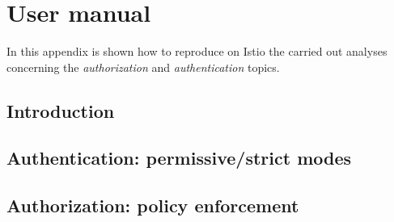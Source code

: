 \appendix
\chapter{User manual}
In this appendix is shown how to reproduce on Istio the carried out analyses concerning the \textit{authorization} and \textit{authentication} topics.
\minitoc

\section{Introduction}


\section{Authentication: permissive/strict modes}

\section{Authorization: policy enforcement}